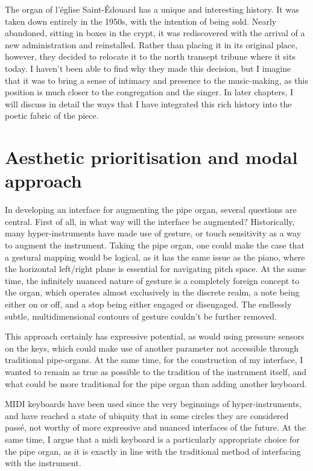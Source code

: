 \documentclass[12pt,twoside,maitrise]{dms_ks}
\theoremstyle{definition}
\begin{document}
{{The organ of l'église Saint-Édouard has a unique and interesting history. 
It was taken down entirely in the 1950s, with the intention of being sold. 
Nearly abandoned, sitting in boxes in the crypt, it was rediscovered with the arrival of a new administration and reinstalled. 
Rather than placing it in its original place, however, they decided to relocate it to the north transept tribune where it sits today. 
I haven't been able to find why they made this decision, but I imagine that it was to bring a sense of intimacy and presence to the music-making, as this position is much closer to the congregation and the singer. 
In later chapters, I will discuss in detail the ways that I have integrated this rich history into the poetic fabric of the piece.

\section{Aesthetic prioritisation and modal approach}

In developing an interface for augmenting the pipe organ, several questions are central.
First of all, in what way will the interface be augmented?
Historically, many hyper-instruments have made use of gesture, or touch sensitivity as a way to augment the instrument.
Taking the pipe organ, one could make the case that a gestural mapping would be logical, as it has the same issue as the piano, where the horizontal left/right plane is essential for navigating pitch space.
At the same time, the infinitely nuanced nature of gesture is a completely foreign concept to the organ, which operates almost exclusively in the discrete realm, a note being either on or off, and a stop being either engaged or disengaged.
The endlessly subtle, multidimensional contours of gesture couldn't be further removed.

This approach certainly has expressive potential, as would using pressure sensors on the keys, which could make use of another parameter not accessible through traditional pipe-organs.
At the same time, for the construction of my interface, I wanted to remain as true as possible to the tradition of the instrument itself, and what could be more traditional for the pipe organ than adding another keyboard.

MIDI keyboards have been used since the very beginnings of hyper-instruments, and have reached a state of ubiquity that in some circles they are considered passé, not worthy of more expressive and nuanced interfaces of the future.
At the same time, I argue that a midi keyboard is a particularly appropriate choice for the pipe organ, as it is exactly in line with the traditional method of interfacing with the instrument.

}}
\end{document}
